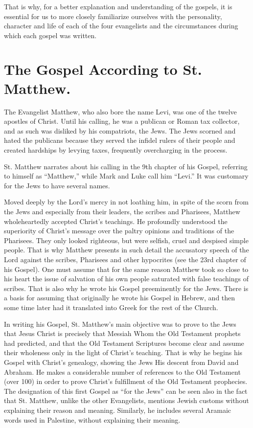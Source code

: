 That is why, for a better explanation and understanding of the gospels, it is essential for us to more closely familiarize ourselves with the personality, character and life of each of the four evangelists and the circumstances during which each gospel was written.



\section{The Gospel According to St. Matthew.}

The Evangelist Matthew, who also bore the name Levi, was one of the twelve apostles of Christ. Until his calling, he was a publican or Roman tax collector, and as such was disliked by his compatriots, the Jews. The Jews scorned and hated the publicans because they served the infidel rulers of their people and created hardships by levying taxes, frequently overcharging in the process.

St. Matthew narrates about his calling in the 9th chapter of his Gospel, referring to himself as ``Matthew,'' while Mark and Luke call him ``Levi.'' It was customary for the Jews to have several names.

Moved deeply by the Lord's mercy in not loathing him, in spite of the scorn from the Jews and especially from their leaders, the scribes and Pharisees, Matthew wholeheartedly accepted Christ's teachings. He profoundly understood the superiority of Christ's message over the paltry opinions and traditions of the Pharisees. They only looked righteous, but were selfish, cruel and despised simple people. That is why Matthew presents in such detail the accusatory speech of the Lord against the scribes, Pharisees and other hypocrites (see the 23rd chapter of his Gospel). One must assume that for the same reason Matthew took so close to his heart the issue of salvation of his own people saturated with false teachings of scribes. That is also why he wrote his Gospel preeminently for the Jews. There is a basis for assuming that originally he wrote his Gospel in Hebrew, and then some time later had it translated into Greek for the rest of the Church.

In writing his Gospel, St. Matthew's main objective was to prove to the Jews that Jesus Christ is precisely that Messiah Whom the Old Testament prophets had predicted, and that the Old Testament Scriptures become clear and assume their wholeness only in the light of Christ's teaching. That is why he begins his Gospel with Christ's genealogy, showing the Jews His descent from David and Abraham. He makes a considerable number of references to the Old Testament (over 100) in order to prove Christ's fulfillment of the Old Testament prophecies. The designation of this first Gospel as ``for the Jews'' can be seen also in the fact that St. Matthew, unlike the other Evangelists, mentions Jewish customs without explaining their reason and meaning. Similarly, he includes several Aramaic words used in Palestine, without explaining their meaning.

